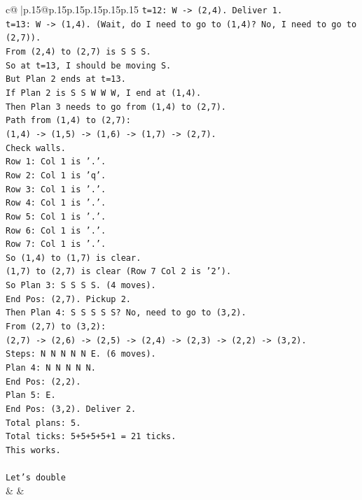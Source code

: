 \documentclass{article}
\begin{document}
{\begin{supertabular}{c@{$\;$}|p{.15\linewidth}@{}p{.15\linewidth}p{.15\linewidth}p{.15\linewidth}p{.15\linewidth}p{.15\linewidth}}
{{{\texttt{t=12: W {-}> (2,4). Deliver 1.} \\
\texttt{t=13: W {-}> (1,4). (Wait, do I need to go to (1,4)? No, I need to go to (2,7)).} \\
\texttt{From (2,4) to (2,7) is S S S.} \\
\texttt{So at t=13, I should be moving S.} \\
\texttt{But Plan 2 ends at t=13.} \\
\texttt{If Plan 2 is S S W W W, I end at (1,4).} \\
\texttt{Then Plan 3 needs to go from (1,4) to (2,7).} \\
\texttt{Path from (1,4) to (2,7):} \\
\texttt{(1,4) {-}> (1,5) {-}> (1,6) {-}> (1,7) {-}> (2,7).} \\
\texttt{Check walls.} \\
\texttt{Row 1: Col 1 is '.'.} \\
\texttt{Row 2: Col 1 is 'q'.} \\
\texttt{Row 3: Col 1 is '.'.} \\
\texttt{Row 4: Col 1 is '.'.} \\
\texttt{Row 5: Col 1 is '.'.} \\
\texttt{Row 6: Col 1 is '.'.} \\
\texttt{Row 7: Col 1 is '.'.} \\
\texttt{So (1,4) to (1,7) is clear.} \\
\texttt{(1,7) to (2,7) is clear (Row 7 Col 2 is '2').} \\
\texttt{So Plan 3: S S S S. (4 moves).} \\
\texttt{End Pos: (2,7). Pickup 2.} \\
\texttt{Then Plan 4: S S S S S? No, need to go to (3,2).} \\
\texttt{From (2,7) to (3,2):} \\
\texttt{(2,7) {-}> (2,6) {-}> (2,5) {-}> (2,4) {-}> (2,3) {-}> (2,2) {-}> (3,2).} \\
\texttt{Steps: N N N N N E. (6 moves).} \\
\texttt{Plan 4: N N N N N.} \\
\texttt{End Pos: (2,2).} \\
\texttt{Plan 5: E.} \\
\texttt{End Pos: (3,2). Deliver 2.} \\
\texttt{Total plans: 5.} \\
\texttt{Total ticks: 5+5+5+5+1 = 21 ticks.} \\
\texttt{This works.} \\
\\ 
\texttt{Let's double} \\
            }
        }
    }
    & & \\ \\


\end{supertabular}}
\end{document}
